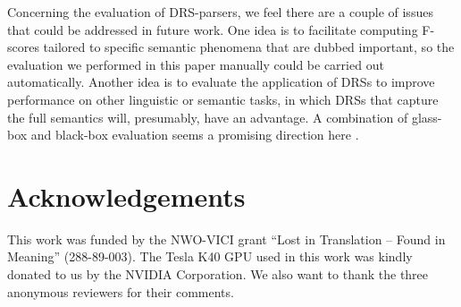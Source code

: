 \documentclass[11pt,a4paper]{article}
\begin{document}
Concerning the evaluation of DRS-parsers, we feel there are a couple of issues that could be addressed in future work. One idea is to facilitate computing F-scores tailored to specific semantic phenomena that are dubbed important, so the evaluation we performed in this paper manually could be carried out automatically.
Another idea is to evaluate the application of DRSs to improve performance on other linguistic or semantic tasks, in which DRSs that capture the full semantics will, presumably, have an advantage. A combination of glass-box and black-box evaluation seems a promising direction here \cite{Bos2008LREC,pmb-LREC:18}.

\section*{Acknowledgements}

This work was funded by the NWO-VICI grant ``Lost in Translation -- Found in Meaning'' (288-89-003). The Tesla K40 GPU used in this work was kindly donated to us by the NVIDIA Corporation. We also want to thank the three anonymous reviewers for their comments.




\appendix
\end{document}
